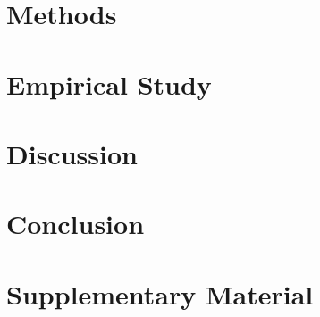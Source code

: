 \documentclass[11pt,a4paper]{article}
\begin{document}
\section{Methods}
\label{sec:methods}


\section{Empirical Study}
\label{sec:results}


\section{Discussion}
\label{sec:discussion}


\section{Conclusion}
\label{sec:conclusion}





\appendix
\section{Supplementary Material}
\label{sec:supplemental}

\end{document}
